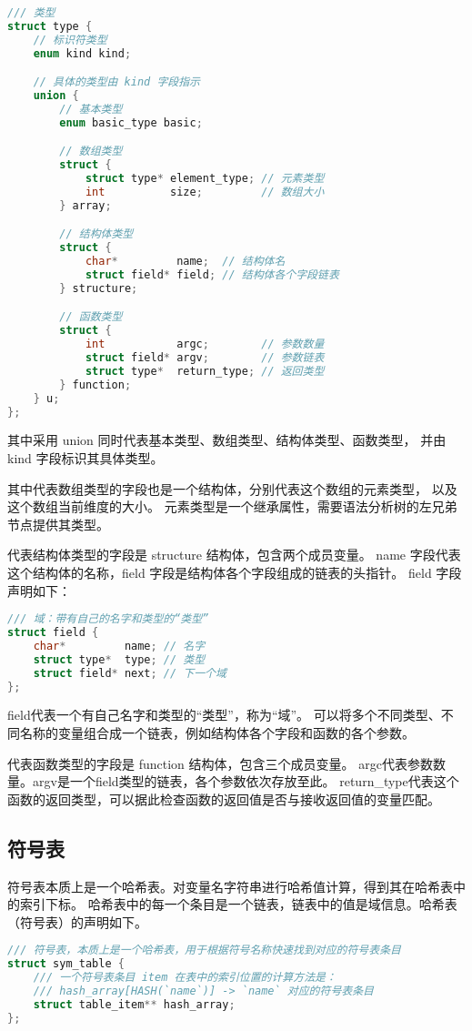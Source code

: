 \documentclass{article}
\begin{document}
\begin{lstlisting}[language=C, caption=类型结构体声明]
/// 类型
struct type {
    // 标识符类型
    enum kind kind;

    // 具体的类型由 kind 字段指示
    union {
        // 基本类型
        enum basic_type basic;

        // 数组类型
        struct {
            struct type* element_type; // 元素类型
            int          size;         // 数组大小
        } array;

        // 结构体类型
        struct {
            char*         name;  // 结构体名
            struct field* field; // 结构体各个字段链表
        } structure;

        // 函数类型
        struct {
            int           argc;        // 参数数量
            struct field* argv;        // 参数链表
            struct type*  return_type; // 返回类型
        } function;
    } u;
};
\end{lstlisting}

其中采用 union 同时代表基本类型、数组类型、结构体类型、函数类型，
并由 kind 字段标识其具体类型。

其中代表数组类型的字段也是一个结构体，分别代表这个数组的元素类型，
以及这个数组当前维度的大小。
元素类型是一个继承属性，需要语法分析树的左兄弟节点提供其类型。

代表结构体类型的字段是 structure 结构体，包含两个成员变量。
name 字段代表这个结构体的名称，field 字段是结构体各个字段组成的链表的头指针。
field 字段声明如下：

\begin{lstlisting}[language=C, caption=field 结构体声明]
/// 域：带有自己的名字和类型的“类型”
struct field {
    char*         name; // 名字
    struct type*  type; // 类型
    struct field* next; // 下一个域
};
\end{lstlisting}

field代表一个有自己名字和类型的“类型”，称为“域”。
可以将多个不同类型、不同名称的变量组合成一个链表，例如结构体各个字段和函数的各个参数。

代表函数类型的字段是 function 结构体，包含三个成员变量。
argc代表参数数量。argv是一个field类型的链表，各个参数依次存放至此。
return\_type代表这个函数的返回类型，可以据此检查函数的返回值是否与接收返回值的变量匹配。

\subsection{符号表}

符号表本质上是一个哈希表。对变量名字符串进行哈希值计算，得到其在哈希表中的索引下标。
哈希表中的每一个条目是一个链表，链表中的值是域信息。哈希表（符号表）的声明如下。

\begin{lstlisting}[language=C, caption=符号表声明]
/// 符号表，本质上是一个哈希表，用于根据符号名称快速找到对应的符号表条目
struct sym_table {
    /// 一个符号表条目 item 在表中的索引位置的计算方法是：
    /// hash_array[HASH(`name`)] -> `name` 对应的符号表条目
    struct table_item** hash_array;
};
\end{lstlisting}
\end{document}
